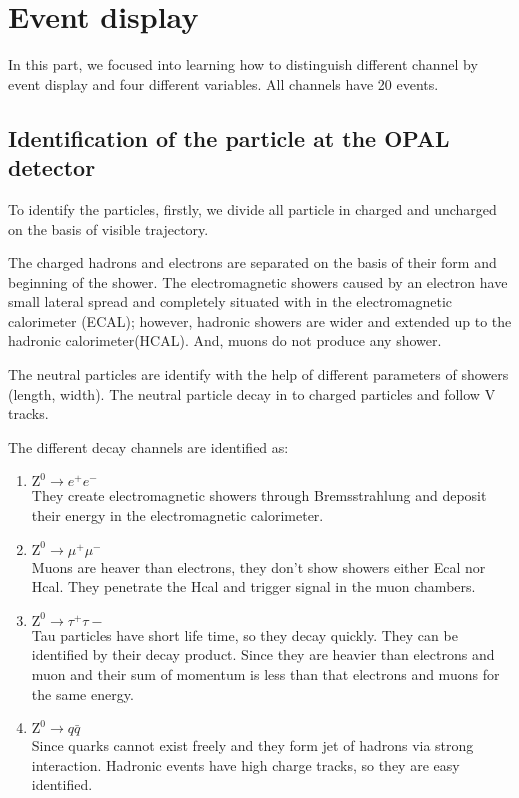 \clearpage
\section{Event display}
In this part, we focused into learning how to distinguish different channel by event display and four different variables. All channels have 20 events. 



\subsection{Identification of the particle at the OPAL detector}
To identify the particles, firstly, we divide all particle in charged and uncharged on the basis of visible trajectory.

The charged hadrons and electrons are separated on the basis of their form and beginning of the shower. The electromagnetic showers caused by an electron have small lateral spread and completely situated with in the electromagnetic calorimeter (ECAL); however, hadronic showers are wider and extended up to the hadronic calorimeter(HCAL). And, muons do not produce any shower.

 The neutral particles are identify with the help of different parameters of showers (length, width). The neutral particle decay in to charged particles and follow V tracks.
 

The different decay channels are identified as:
\begin{enumerate}
\item $ \text{Z}^0\rightarrow e^+e^- $\\
They create electromagnetic showers through Bremsstrahlung and deposit their energy in the electromagnetic calorimeter. 

\item $ \text{Z}^0\rightarrow \mu^+\mu^- $\\ 
Muons are heaver than electrons, they don't show showers either Ecal nor Hcal. They penetrate the Hcal and trigger signal in the muon chambers.

\item $ \text{Z}^0\rightarrow \tau^+\tau-$\\
Tau particles have short life time, so they decay quickly. They can be identified by their decay product. Since they are heavier than electrons and muon and their sum of momentum is less than that electrons and muons for the same energy.

\item $ \text{Z}^0\rightarrow q\bar{q}$\\
Since quarks cannot exist freely and they form jet of hadrons via strong interaction. Hadronic events have high charge tracks, so they are easy identified.
\end{enumerate}

